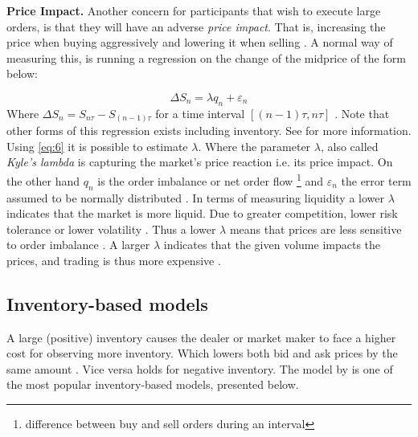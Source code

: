 \documentclass{kththesis}
\theoremstyle{definition}
\begin{document}
\textbf{Price Impact.} Another concern for participants that wish to execute large orders, is that they will have an adverse \textit{price impact}. That is, increasing the price when buying aggressively and lowering it when selling \parencite{cartea2015algorithmic, bouchaud2018trades}. A normal way of measuring this, is running a regression on the change of the midprice of the form below:

\begin{equation}
    \label{eq:6}
    \Delta S_n = \lambda q_n + \varepsilon_n
\end{equation}
Where $\Delta S_n = S_{n\tau}-S_{(n-1)\tau}$ for a time interval $[(n-1)\tau, n\tau]$ \parencite{cartea2015algorithmic}. Note that other forms of this regression exists including inventory. See \textcite{foucault2013market} for more information. Using \autoref{eq:6} it is possible to estimate $\lambda$. Where the parameter $\lambda$, also called \textit{Kyle's lambda} \parencite{bouchaud2018trades} is capturing the market's price reaction i.e. its price impact. On the other hand $q_n$ is the order imbalance or net order flow \footnote{difference between buy and sell orders during an interval} and  $\varepsilon_n$ the error term assumed to be normally distributed \parencite{cartea2015algorithmic, foucault2013market}. 
\newline
\newline
In terms of measuring liquidity a lower $\lambda$ indicates that the market is more liquid. Due to greater competition, lower risk tolerance or lower volatility \parencite{cartea2015algorithmic}. Thus a lower $\lambda$ means that prices are less sensitive to order imbalance \parencite{foucault2013market}.  A larger $\lambda$ indicates that the given volume impacts the prices, and trading is thus more expensive \parencite{bouchaud2018trades}.
\newpage

\subsection{Inventory-based models}
A large (positive) inventory causes the dealer or market maker to face a higher cost for observing more inventory. Which lowers both bid and ask prices by the same amount \parencite{o1995market}. Vice versa holds for negative inventory. The model by \textcite{ho1981optimal} is one of the most popular inventory-based models, presented below.
\newline
\end{document}
